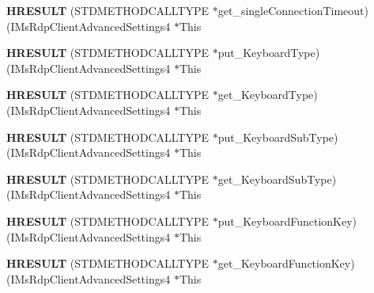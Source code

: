 \begin{DoxyCompactItemize}
{\bfseries H\+R\+E\+S\+U\+LT} (S\+T\+D\+M\+E\+T\+H\+O\+D\+C\+A\+L\+L\+T\+Y\+PE $\ast$get\+\_\+single\+Connection\+Timeout)(I\+Ms\+Rdp\+Client\+Advanced\+Settings4 $\ast$This
\item 
\mbox{\label{struct_i_ms_rdp_client_advanced_settings4_vtbl_a779572c89c3693e720d5a9830284dc70}} 
{\bfseries H\+R\+E\+S\+U\+LT} (S\+T\+D\+M\+E\+T\+H\+O\+D\+C\+A\+L\+L\+T\+Y\+PE $\ast$put\+\_\+\+Keyboard\+Type)(I\+Ms\+Rdp\+Client\+Advanced\+Settings4 $\ast$This
\item 
\mbox{\label{struct_i_ms_rdp_client_advanced_settings4_vtbl_ab0a7e3cbcfff309bac1ddb24e8396f1f}} 
{\bfseries H\+R\+E\+S\+U\+LT} (S\+T\+D\+M\+E\+T\+H\+O\+D\+C\+A\+L\+L\+T\+Y\+PE $\ast$get\+\_\+\+Keyboard\+Type)(I\+Ms\+Rdp\+Client\+Advanced\+Settings4 $\ast$This
\item 
\mbox{\label{struct_i_ms_rdp_client_advanced_settings4_vtbl_a346cc547b35e16ea611b2c30edcac276}} 
{\bfseries H\+R\+E\+S\+U\+LT} (S\+T\+D\+M\+E\+T\+H\+O\+D\+C\+A\+L\+L\+T\+Y\+PE $\ast$put\+\_\+\+Keyboard\+Sub\+Type)(I\+Ms\+Rdp\+Client\+Advanced\+Settings4 $\ast$This
\item 
\mbox{\label{struct_i_ms_rdp_client_advanced_settings4_vtbl_ab1fdeca4cc878bae88e626308d4f138d}} 
{\bfseries H\+R\+E\+S\+U\+LT} (S\+T\+D\+M\+E\+T\+H\+O\+D\+C\+A\+L\+L\+T\+Y\+PE $\ast$get\+\_\+\+Keyboard\+Sub\+Type)(I\+Ms\+Rdp\+Client\+Advanced\+Settings4 $\ast$This
\item 
\mbox{\label{struct_i_ms_rdp_client_advanced_settings4_vtbl_a9e28bcb93d8480bfffcc9affdd1f8083}} 
{\bfseries H\+R\+E\+S\+U\+LT} (S\+T\+D\+M\+E\+T\+H\+O\+D\+C\+A\+L\+L\+T\+Y\+PE $\ast$put\+\_\+\+Keyboard\+Function\+Key)(I\+Ms\+Rdp\+Client\+Advanced\+Settings4 $\ast$This
\item 
\mbox{\label{struct_i_ms_rdp_client_advanced_settings4_vtbl_a611090c4d790b93827117c46441a001c}} 
{\bfseries H\+R\+E\+S\+U\+LT} (S\+T\+D\+M\+E\+T\+H\+O\+D\+C\+A\+L\+L\+T\+Y\+PE $\ast$get\+\_\+\+Keyboard\+Function\+Key)(I\+Ms\+Rdp\+Client\+Advanced\+Settings4 $\ast$This

\end{DoxyCompactItemize}
